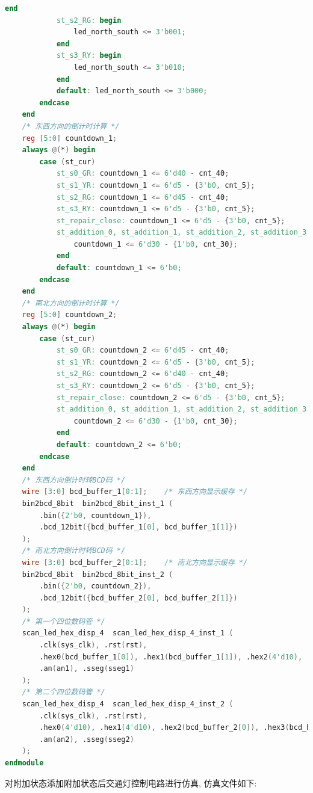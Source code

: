 \documentclass{article}
\begin{document}
\begin{lstlisting}[language=Verilog, caption={添加附加状态的交通灯控制电路源文件}]
            end
            st_s2_RG: begin
                led_north_south <= 3'b001;
            end
            st_s3_RY: begin
                led_north_south <= 3'b010;
            end
            default: led_north_south <= 3'b000;
        endcase
    end
    /* 东西方向的倒计时计算 */
    reg [5:0] countdown_1; 
    always @(*) begin
        case (st_cur)
            st_s0_GR: countdown_1 <= 6'd40 - cnt_40;
            st_s1_YR: countdown_1 <= 6'd5 - {3'b0, cnt_5};
            st_s2_RG: countdown_1 <= 6'd45 - cnt_40;
            st_s3_RY: countdown_1 <= 6'd5 - {3'b0, cnt_5};
            st_repair_close: countdown_1 <= 6'd5 - {3'b0, cnt_5};
            st_addition_0, st_addition_1, st_addition_2, st_addition_3: begin
                countdown_1 <= 6'd30 - {1'b0, cnt_30};
            end
            default: countdown_1 <= 6'b0;
        endcase
    end
    /* 南北方向的倒计时计算 */
    reg [5:0] countdown_2;
    always @(*) begin
        case (st_cur)
            st_s0_GR: countdown_2 <= 6'd45 - cnt_40;
            st_s1_YR: countdown_2 <= 6'd5 - {3'b0, cnt_5};
            st_s2_RG: countdown_2 <= 6'd40 - cnt_40;
            st_s3_RY: countdown_2 <= 6'd5 - {3'b0, cnt_5};
            st_repair_close: countdown_2 <= 6'd5 - {3'b0, cnt_5};
            st_addition_0, st_addition_1, st_addition_2, st_addition_3: begin
                countdown_2 <= 6'd30 - {1'b0, cnt_30};
            end
            default: countdown_2 <= 6'b0;
        endcase
    end
    /* 东西方向倒计时转BCD码 */
    wire [3:0] bcd_buffer_1[0:1];    /* 东西方向显示缓存 */
    bin2bcd_8bit  bin2bcd_8bit_inst_1 (
        .bin({2'b0, countdown_1}),
        .bcd_12bit({bcd_buffer_1[0], bcd_buffer_1[1]})
    );
    /* 南北方向倒计时转BCD码 */
    wire [3:0] bcd_buffer_2[0:1];    /* 南北方向显示缓存 */
    bin2bcd_8bit  bin2bcd_8bit_inst_2 (
        .bin({2'b0, countdown_2}),
        .bcd_12bit({bcd_buffer_2[0], bcd_buffer_2[1]})
    );
    /* 第一个四位数码管 */
    scan_led_hex_disp_4  scan_led_hex_disp_4_inst_1 (
        .clk(sys_clk), .rst(rst),
        .hex0(bcd_buffer_1[0]), .hex1(bcd_buffer_1[1]), .hex2(4'd10), .hex3(4'd10), .dp(4'b0000),
        .an(an1), .sseg(sseg1)
    );
    /* 第二个四位数码管 */
    scan_led_hex_disp_4  scan_led_hex_disp_4_inst_2 (
        .clk(sys_clk), .rst(rst),
        .hex0(4'd10), .hex1(4'd10), .hex2(bcd_buffer_2[0]), .hex3(bcd_buffer_2[1]), .dp(4'b0000),
        .an(an2), .sseg(sseg2)
    );
endmodule
\end{lstlisting}
对附加状态添加附加状态后交通灯控制电路进行仿真, 仿真文件如下:
\end{document}
